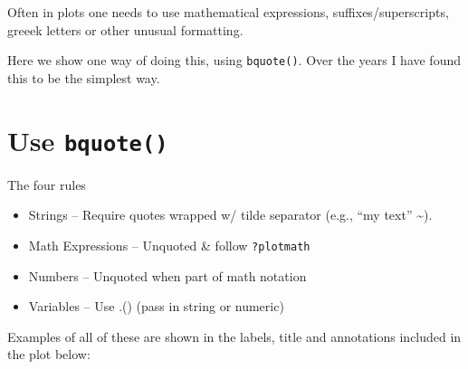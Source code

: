 \documentclass[
  letterpaper,
  DIV=11,
  numbers=noendperiod]{scrreprt}
\providecommand{\tightlist}{%
  \setlength{\itemsep}{0pt}\setlength{\parskip}{0pt}}\usepackage{longtable,booktabs,array}
\begin{document}
Often in plots one needs to use mathematical expressions,
suffixes/superscripts, greeek letters or other unusual formatting.

Here we show one way of doing this, using \texttt{bquote()}. Over the
years I have found this to be the simplest way.

\section{\texorpdfstring{Use
\texttt{bquote()}}{Use bquote()}}\label{use-bquote}

The four rules

\begin{itemize}
\tightlist
\item
  Strings -- Require quotes wrapped w/ tilde separator (e.g., ``my
  text'' \textasciitilde).
\item
  Math Expressions -- Unquoted \& follow \texttt{?plotmath}
\item
  Numbers -- Unquoted when part of math notation
\item
  Variables -- Use .() (pass in string or numeric)
\end{itemize}

Examples of all of these are shown in the labels, title and annotations
included in the plot below:
\end{document}

